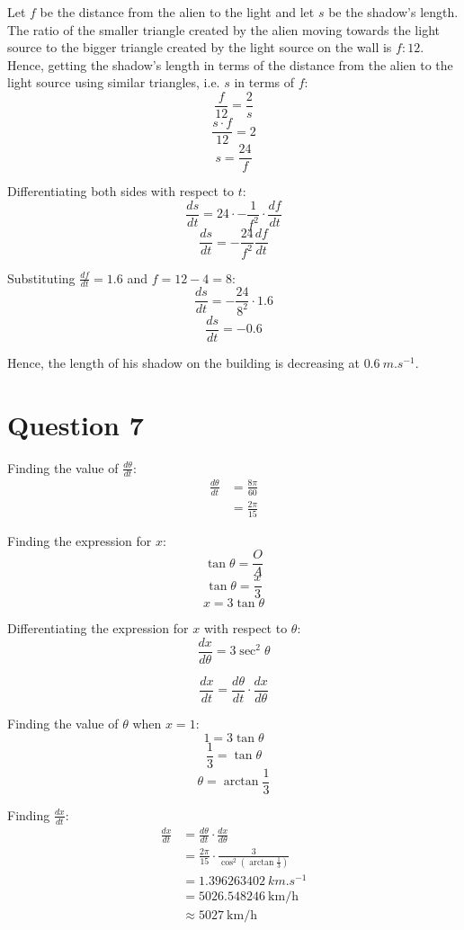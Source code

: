 \documentclass[11pt]{article}
\begin{document}
Let \(f\) be the distance from the alien to the light and let \(s\) be the shadow's length.
\\[0pt]

The ratio of the smaller triangle created by the alien moving towards the light source to the bigger triangle created by the light source on the wall is \(f : 12\).
\\[0pt]

Hence, getting the shadow's length in terms of the distance from the alien to the light source using similar triangles, i.e. \(s\) in terms of \(f\):
\[\frac{f}{12} = \frac{2}{s}\]
\[\frac{s \cdot f}{12} = 2\]
\[s = \frac{24}{f}\]

Differentiating both sides with respect to \(t\):
\[\frac{ds}{dt} = 24 \cdot -\frac{1}{f^2} \cdot \frac{df}{dt} \]
\[\frac{ds}{dt} = -\frac{24}{f^2} \frac{df}{dt}\]

Substituting \(\frac{df}{dt} = 1.6\) and \(f = 12 - 4 = 8\):
\[\frac{ds}{dt} = -\frac{24}{8^2} \cdot 1.6\]
\[\frac{ds}{dt} = - 0.6\]

Hence, the length of his shadow on the building is decreasing at \(\qty{0.6}{\unit{m.s^{-1}}}\).

\newpage

\section{Question 7}
\label{sec:org2907b1b}

Finding the value of \(\frac{d \theta}{dt}\):
\begin{align*}
\frac{d \theta}{dt} &= \frac{8 \pi}{60} \\
&= \frac{2 \pi}{15}
\end{align*}

Finding the expression for \(x\):
\[\tan \theta = \frac{O}{A}\]
\[\tan \theta = \frac{x}{3}\]
\[x = 3 \tan \theta\]

Differentiating the expression for \(x\) with respect to \(\theta\):
\[\frac{dx}{d \theta} = 3 \sec^2 \theta\]

\[\frac{dx}{dt} = \frac{d \theta}{dt} \cdot \frac{dx}{d \theta}\]

Finding the value of \(\theta\) when \(x = 1\):
\[1 = 3 \tan \theta\]
\[\frac{1}{3} = \tan \theta\]
\[\theta = \arctan \frac{1}{3}\]

Finding \(\frac{dx}{dt}\):
\begin{align*}
\frac{dx}{dt} &= \frac{d \theta}{dt} \cdot \frac{dx}{d \theta} \\
&= \frac{2 \pi}{15} \cdot \frac{3}{\cos^2 \left(\arctan \frac{1}{3} \right)} \\
&= \qty{1.396263402}{\unit{km.s^{-1}}} \\
&= \qty{5026.548246}{\unit{\kilo\metre\per\hour}} \\
&\approx \qty{5027}{\unit{\kilo\metre\per\hour}}
\end{align*}
\end{document}

